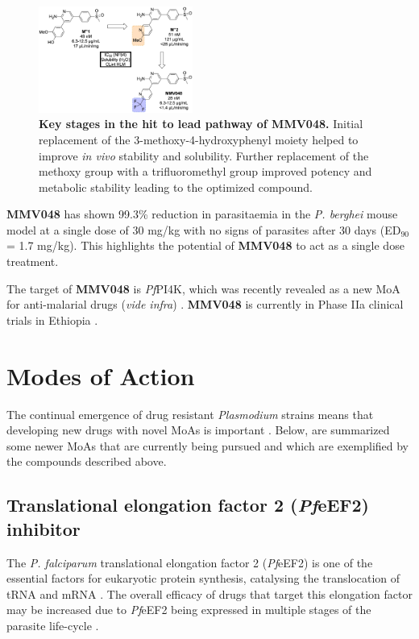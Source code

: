 \documentclass[twocolumn]{bmcart}%
\begin{document}
\begin{figure}[h]
	\includegraphics [width=0.45\textwidth] {Figure33}
	\caption{{\bf Key stages in the hit to lead pathway of MMV048.} Initial replacement of the 3-methoxy-4-hydroxyphenyl moiety helped to improve \textit{in vivo} stability and solubility. Further replacement of the methoxy group with a trifluoromethyl group improved potency and metabolic stability leading to the optimized compound.}
	\label{Figure33}
\end{figure}

\textbf{MMV048} has shown 99.3\% reduction in parasitaemia in the \textit{P. berghei} mouse model at a single dose of 30 mg/kg with no signs of parasites after 30 days (ED$_{90}$ = 1.7 mg/kg). This highlights the potential of \textbf{MMV048} to act as a single dose treatment.

The target of \textbf{MMV048} is \textit{Pf}PI4K, which was recently revealed as a new MoA for anti-malarial drugs (\textit{vide infra}) \cite{McNamara2013}. \textbf{MMV048} is currently in Phase IIa clinical trials in Ethiopia \cite{MMV}.

\section*{Modes of Action}
The continual emergence of drug resistant \textit{Plasmodium} strains means that developing new drugs with novel MoAs is important \cite{Nigussie2015}. Below, are summarized some newer MoAs that are currently being pursued and which are exemplified by the compounds described above.

\subsection*{Translational elongation factor 2 (\textit{Pf}eEF2) inhibitor}
The \textit{P. falciparum} translational elongation factor 2 (\textit{Pf}eEF2) is one of the essential factors for eukaryotic protein synthesis, catalysing the translocation of tRNA and mRNA \cite{Jorgensen2006}. The overall efficacy of drugs that target this elongation factor may be increased due to \textit{Pf}eEF2 being expressed in multiple stages of the parasite life-cycle \cite{Baragana2015}.
\end{document}
